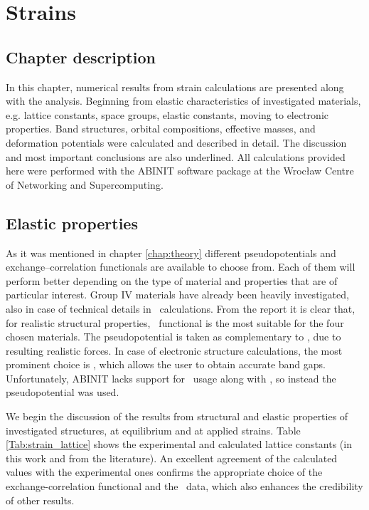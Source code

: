 \chapter{Strains}
\label{chap:strains}

\section*{Chapter description}

In this chapter, numerical results from strain calculations are presented along with the analysis.
Beginning from elastic characteristics of investigated materials, e.g. lattice constants, space groups, elastic constants, moving to electronic properties.
Band structures, orbital compositions, effective masses, and deformation potentials were calculated and described in detail.
The discussion and most important conclusions are also underlined.
All calculations provided here were performed with the ABINIT\cite{abinit1,abinit2,libxc} software package at the Wrocław Centre of Networking and Supercomputing.
\ornament
\section{Elastic properties}

As it was mentioned in chapter \ref{chap:theory} different pseudopotentials and exchange--correlation functionals are available to choose from.
Each of them will perform better depending on the type of material and properties that are of particular interest.
Group IV materials have already been heavily investigated, also in case of technical details in \abinitio\ calculations.
From the report \cite{LDA_choice} it is clear that, for realistic structural properties, \LDA\ functional is the most suitable for the four chosen materials.
The \PAW\cite{paw, paw2} pseudopotential is taken as complementary to \LDA, due to resulting realistic forces.
In case of electronic structure calculations, the most prominent choice is \mBJLDA\cite{mBJLDA, mBJLDA2}, which allows the user to obtain accurate band gaps.
Unfortunately, ABINIT lacks support for \PAW\ usage along with \mBJLDA, so instead the \HGH\cite{hgh} pseudopotential was used.

We begin the discussion of the results from structural and elastic properties of investigated structures, at equilibrium and at applied strains.
Table \ref{Tab:strain_lattice} shows the experimental and calculated lattice constants (in this work and from the literature).
An excellent agreement of the calculated values with the experimental ones confirms the appropriate choice of the exchange-correlation functional and the \PAW\ data, which also enhances the credibility of other results.

